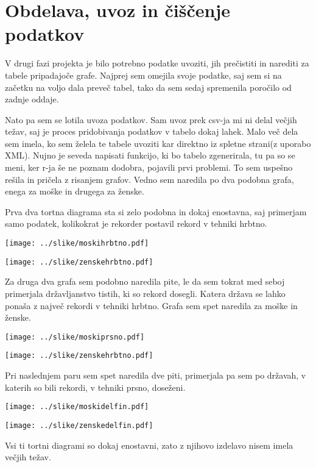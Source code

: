 \documentclass[11pt,a4paper]{article}
\begin{document}
\section{Obdelava, uvoz in čiščenje podatkov}

V drugi fazi projekta je bilo potrebno podatke uvoziti, jih prečistiti in narediti za tabele pripadajoče grafe. Najprej sem omejila svoje podatke, saj sem si na začetku na voljo dala preveč tabel, tako da sem sedaj spremenila poročilo od zadnje oddaje.

Nato pa sem se lotila uvoza podatkov. Sam uvoz prek csv-ja mi ni delal večjih težav, saj je proces pridobivanja podatkov v tabelo dokaj lahek. Malo več dela sem imela, ko sem želela te tabele uvoziti kar direktno iz spletne strani(z uporabo XML). Nujno je seveda napisati funkcijo, ki bo tabelo zgenerirala, tu pa so se meni, ker r-ja še ne poznam dodobra, pojavili prvi problemi. To sem uspešno rešila in pričela z risanjem grafov. Vedno sem naredila po dva podobna grafa, enega za moške in drugega za ženske.

Prva dva tortna diagrama sta si zelo podobna in dokaj enostavna, saj primerjam samo podatek, kolikokrat je rekorder postavil rekord v tehniki hrbtno. 

\texttt{[image: ../slike/moskihrbtno.pdf]}

\texttt{[image: ../slike/zenskehrbtno.pdf]}

Za druga dva grafa sem podobno naredila pite, le da sem tokrat med seboj primerjala državljanstvo tistih, ki so rekord dosegli. Katera država se lahko ponaša z največ rekordi v tehniki hrbtno. Grafa sem spet naredila za moške in ženske.

\texttt{[image: ../slike/moskiprsno.pdf]}

\texttt{[image: ../slike/zenskehrbtno.pdf]}

Pri naslednjem paru sem spet naredila dve piti, primerjala pa sem po državah, v katerih so bili rekordi, v tehniki prsno, doseženi.

\texttt{[image: ../slike/moskidelfin.pdf]}

\texttt{[image: ../slike/zenskedelfin.pdf]}

Vsi ti tortni diagrami so dokaj enostavni, zato z njihovo izdelavo nisem imela večjih težav.
\end{document}
